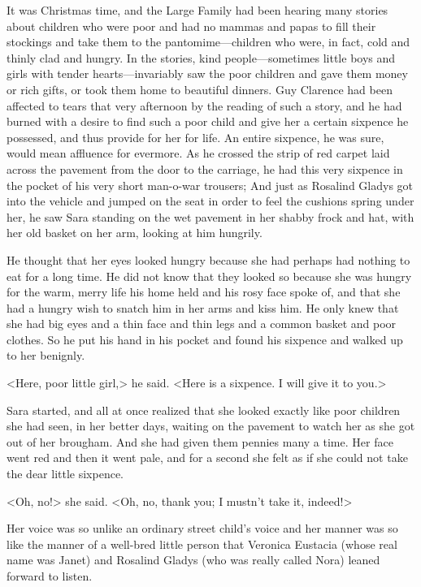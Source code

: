 It was Christmas time, and the Large Family had been hearing many stories about children who were poor and had no mammas and papas to fill their stockings and take them to the pantomime—children who were, in fact, cold and thinly clad and hungry. In the stories, kind people—sometimes little boys and girls with tender hearts—invariably saw the poor children and gave them money or rich gifts, or took them home to beautiful dinners. Guy Clarence had been affected to tears that very afternoon by the reading of such a story, and he had burned with a desire to find such a poor child and give her a certain sixpence he possessed, and thus provide for her for life. An entire sixpence, he was sure, would mean affluence for evermore. As he crossed the strip of red carpet laid across the pavement from the door to the carriage, he had this very sixpence in the pocket of his very short man-o-war trousers; And just as Rosalind Gladys got into the vehicle and jumped on the seat in order to feel the cushions spring under her, he saw Sara standing on the wet pavement in her shabby frock and hat, with her old basket on her arm, looking at him hungrily.

He thought that her eyes looked hungry because she had perhaps had nothing to eat for a long time. He did not know that they looked so because she was hungry for the warm, merry life his home held and his rosy face spoke of, and that she had a hungry wish to snatch him in her arms and kiss him. He only knew that she had big eyes and a thin face and thin legs and a common basket and poor clothes. So he put his hand in his pocket and found his sixpence and walked up to her benignly.

<Here, poor little girl,> he said. <Here is a sixpence. I will give it to you.>

Sara started, and all at once realized that she looked exactly like poor children she had seen, in her better days, waiting on the pavement to watch her as she got out of her brougham. And she had given them pennies many a time. Her face went red and then it went pale, and for a second she felt as if she could not take the dear little sixpence.

<Oh, no!> she said. <Oh, no, thank you; I mustn't take it, indeed!>

Her voice was so unlike an ordinary street child's voice and her manner was so like the manner of a well-bred little person that Veronica Eustacia (whose real name was Janet) and Rosalind Gladys (who was really called Nora) leaned forward to listen.

